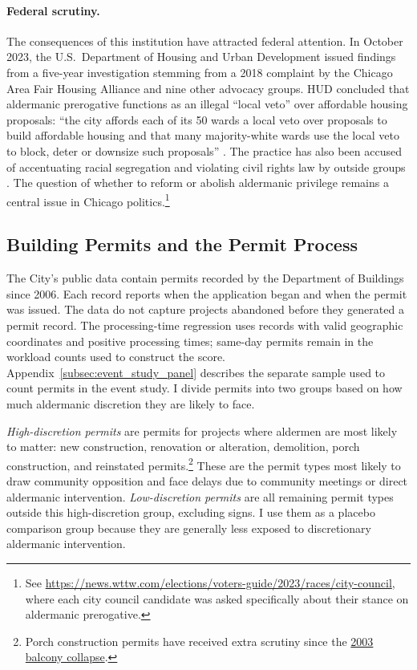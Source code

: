 \paragraph{Federal scrutiny.}
The consequences of this institution have
attracted federal attention.
In October 2023, the U.S.\ Department of Housing and
Urban Development issued findings from a five-year investigation stemming from a
2018 complaint by the Chicago Area Fair Housing Alliance and nine other advocacy
groups.
HUD concluded that aldermanic prerogative functions as an illegal ``local
veto'' over affordable housing proposals: ``the city affords each of its 50 wards a
local veto over proposals to build affordable housing and that many majority-white
wards use the local veto to block, deter or downsize such proposals''
\citep{chase_chicago_2023}. 
The practice has also been accused of accentuating racial segregation and violating civil rights law by outside groups \citep{shriver_center_on_poverty_law_city_2019}.
 The question of whether to reform or abolish aldermanic privilege remains a central issue in Chicago politics.\footnote{See
\url{https://news.wttw.com/elections/voters-guide/2023/races/city-council}, where
each city council candidate was asked specifically about their stance on aldermanic
prerogative.}

\subsection{Building Permits and the Permit Process}
\label{subsec:permit_pipeline}

The City's public data contain permits recorded by the Department of Buildings since 2006.
Each record reports when the application began and when the permit was issued.
The data do not capture projects abandoned before they generated a permit record.
The processing-time regression uses records with valid geographic coordinates and positive processing times; same-day permits remain in the workload counts used to construct the score.
Appendix~\ref{subsec:event_study_panel} describes the separate sample used to count permits in the event study.
I divide permits into two groups based on how much aldermanic discretion they are likely to face.

\textit{High-discretion permits} are permits for projects where aldermen are most likely to matter: new construction, renovation or alteration, demolition, porch construction, and reinstated permits.\footnote{Porch construction permits have received extra scrutiny since the \href{https://en.wikipedia.org/wiki/2003_Chicago_balcony_collapse}{2003 balcony collapse}.}
These are the permit types most likely to draw community opposition and face delays due to community meetings or direct aldermanic intervention.
\textit{Low-discretion permits} are all remaining permit types outside this high-discretion group, excluding signs.
I use them as a placebo comparison group because they are generally less exposed to discretionary aldermanic intervention.

